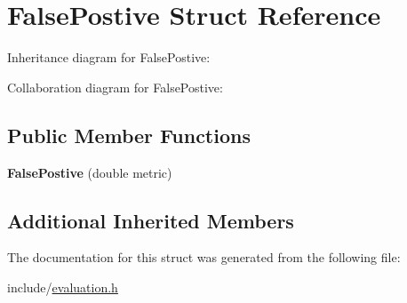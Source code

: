 \hypertarget{structFalsePostive}{}\section{False\+Postive Struct Reference}
\label{structFalsePostive}


Inheritance diagram for False\+Postive\+:


Collaboration diagram for False\+Postive\+:
\subsection*{Public Member Functions}
\begin{DoxyCompactItemize}
\item 
\mbox{\label{structFalsePostive_aaf4d2a8bbea2d3145082f5cf9b38eea2}} 
{\bfseries False\+Postive} (double metric)
\end{DoxyCompactItemize}
\subsection*{Additional Inherited Members}


The documentation for this struct was generated from the following file\+:\begin{DoxyCompactItemize}
\item 
include/\hyperlink{evaluation_8h}{evaluation.\+h}\end{DoxyCompactItemize}
